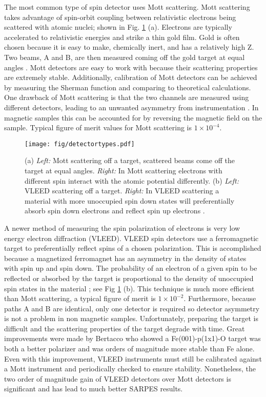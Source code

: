 \documentclass[12pt]{article}
\begin{document}
The most common type of spin detector uses Mott scattering.
Mott scattering takes advantage of spin-orbit coupling between relativistic electrons being scattered with atomic nuclei; shown in Fig. \ref{fig:detectortypes} (a).
Electrons are typically accelerated to relativistic energies and strike a thin gold film.
Gold is often chosen because it is easy to make, chemically inert, and has a relatively high Z.
Two beams, A and B, are then measured coming off the gold target at equal angles \cite{Hoesch}.
Mott detectors are easy to work with because their scattering properties are extremely stable.
Additionally, calibration of Mott detectors can be achieved by measuring the Sherman function and comparing to theoretical calculations.
One drawback of Mott scattering is that the two channels are measured using different detectors, leading to an unwanted asymmetry from instrumentation \cite{Okuda-Kimura}.
In magnetic samples this can be accounted for by reversing the magnetic field on the sample.
Typical figure of merit values for Mott scattering is $1\times10^{-4}$.

\begin{figure}[h]
  \centering
  \texttt{[image: fig/detectortypes.pdf]}
  \caption{(a) \textit{Left:}  Mott scattering off a target, scattered beams come off the target at equal angles.  \textit{Right:}  In Mott scattering electrons with different spin interact with the atomic potential differently.  (b) \textit{Left:}  VLEED scattering off a target.  \textit{Right:}  In VLEED scattering a material with more unoccupied spin down states will preferentially absorb spin down electrons and reflect spin up electrons \cite{Okuda-Kimura}.}
  \label{fig:detectortypes}
\end{figure}

A newer method of measuring the spin polarization of electrons is very low energy electron diffraction (VLEED).
VLEED spin detectors use a ferromagnetic target to preferentially reflect spins of a chosen polarization.
This is accomplished because a magnetized ferromagnet has an asymmetry in the density of states with spin up and spin down.
The probability of an electron of a given spin to be reflected or absorbed by the target is proportional to the density of unoccupied spin states in the material \cite{Okuda-Kimura}; see Fig \ref{fig:detectortypes} (b).
This technique is much more efficient than Mott scattering, a typical figure of merit is $1\times10^{-2}$.
Furthermore, because paths A and B are identical, only one detector is required so detector asymmetry is not a problem in non magnetic samples.
Unfortunately, preparing the target is difficult and the scattering properties of the target degrade with time.
Great improvements were made by Bertacco \cite{Bertacco} who showed a Fe(001)-p(1x1)-O target was both a better polarizer and was orders of magnitude more stable than Fe alone.
Even with this improvement, VLEED instruments must still be calibrated against a Mott instrument and periodically checked to ensure stability.
Nonetheless, the two order of magnitude gain of VLEED detectors over Mott detectors is significant and has lead to much better SARPES results.
\end{document}
